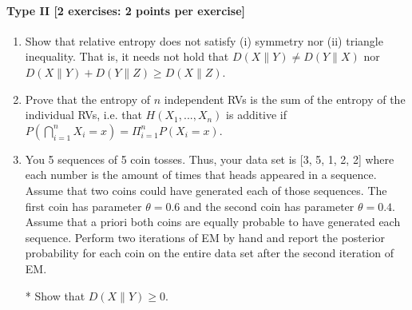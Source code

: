 \documentclass{article}
\begin{document}
\paragraph{Type II [2 exercises: 2 points per exercise]}
\begin{enumerate}
	\item Show that relative entropy does not satisfy (i) symmetry nor (ii) triangle inequality. That is, it needs not hold that $D(X\parallel Y) \neq  D(Y \parallel X)$ nor $D(X\parallel Y) + D(Y\parallel Z) \geq D(X \parallel Z)$.
	\item Prove that the entropy of $n$ independent RVs is the sum of the entropy of the individual RVs, i.e. that  $H(X_1, ..., X_n)$ is additive if $P(\bigcap_{i = 1}^{n} X_i=x) = \Pi_{i = 1}^n P(X_i=x)$.
	\item You 5 sequences of 5 coin tosses. Thus, your data set is  [3, 5, 1, 2, 2]  where each number
	is the amount of times that heads appeared in a sequence. Assume that two coins could have generated
	each of those sequences. The first coin has parameter $ \theta = 0.6 $ and the second coin has 
	parameter $ \theta = 0.4 $. Assume that a priori both coins are equally probable to have generated 
	each sequence. Perform two iterations of EM by hand and report the posterior probability for
	each coin on the entire data set after the second iteration of EM.
	\item[*] Show that $D(X\parallel Y) \geq 0$.

\end{enumerate}
\end{document}
